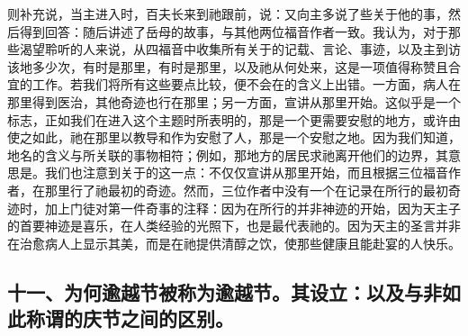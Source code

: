 则补充说，当主进入时，百夫长来到祂跟前，说：又向主多说了些关于他的事，然后得到回答：随后讲述了岳母的故事，与其他两位福音作者一致。我认为，对于那些渴望聆听的人来说，从四福音中收集所有关于的记载、言论、事迹，以及主到访该地多少次，有时是那里，有时是那里，以及祂从何处来，这是一项值得称赞且合宜的工作。若我们将所有这些要点比较，便不会在的含义上出错。一方面，病人在那里得到医治，其他奇迹也行在那里；另一方面，宣讲从那里开始。这似乎是一个标志，正如我们在进入这个主题时所表明的，那是一个更需要安慰的地方，或许由使之如此，祂在那里以教导和作为安慰了人，那是一个安慰之地。因为我们知道，地名的含义与所关联的事物相符；例如，那地方的居民求祂离开他们的边界，其意思是。我们也注意到关于的这一点：不仅仅宣讲从那里开始，而且根据三位福音作者，在那里行了祂最初的奇迹。然而，三位作者中没有一个在记录在所行的最初奇迹时，加上门徒对第一件奇事的注释：因为在所行的并非神迹的开始，因为天主子的首要神迹是喜乐，在人类经验的光照下，也是最代表祂的。因为天主的圣言并非在治愈病人上显示其美，而是在祂提供清醇之饮，使那些健康且能赴宴的人快乐。\par


\subsection{十一、为何逾越节被称为逾越节。其设立：以及与非如此称谓的庆节之间的区别。}

